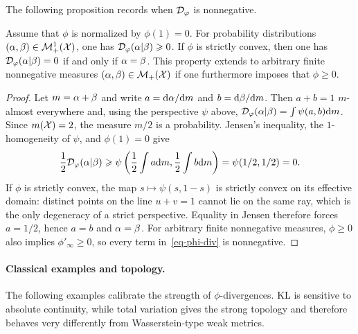 The following proposition records when $\mathcal{D}_\varphi$ is nonnegative.

\begin{proposition}\label{phi-div-positive}
Assume that $\phi$ is normalized by $\phi(1)=0$. For probability distributions $(\alpha,\beta) \in \mathcal{M}_+^1(\mathcal{X})$, one has $\mathcal{D}_\varphi(\alpha|\beta) \geqslant 0$. If $\phi$ is strictly convex, then one has $\mathcal{D}_\varphi(\alpha|\beta)=0$ if and only if $\alpha=\beta$.
%
This property extends to arbitrary finite nonnegative measures $(\alpha,\beta) \in \mathcal{M}_+(\mathcal{X})$ if one furthermore imposes that $\phi \geq 0$.
\end{proposition}

\begin{proof}
	Let $m=\alpha+\beta$ and write $a=\mathrm{d}\alpha/\mathrm{d} m$ and $b=\mathrm{d}\beta/\mathrm{d} m$. Then $a+b=1$ $m$-almost everywhere and, using the perspective $\psi$ above,
		\(\mathcal{D}_\varphi(\alpha|\beta)=\int \psi(a,b)\mathrm{d} m\).
	Since $m(\mathcal{X})=2$, the measure $m/2$ is a probability. Jensen's inequality, the $1$-homogeneity of $\psi$, and $\phi(1)=0$ give
		\[
			\frac12\mathcal{D}_\varphi(\alpha|\beta)
			\geqslant
			\psi\left( \frac12\int a\mathrm{d} m,\frac12\int b\mathrm{d} m \right)
			=\psi(1/2,1/2)=0.
		\]
	If $\phi$ is strictly convex, the map $s\mapsto\psi(s,1-s)$ is strictly convex on its effective domain: distinct points on the line $u+v=1$ cannot lie on the same ray, which is the only degeneracy of a strict perspective. Equality in Jensen therefore forces $a=1/2$, hence $a=b$ and $\alpha=\beta$. For arbitrary finite nonnegative measures, $\phi\geq0$ also implies $\phi'_\infty\geq0$, so every term in~\eqref{eq-phi-div} is nonnegative.
\end{proof}

\paragraph{Classical examples and topology.}

The following examples calibrate the strength of $\phi$-divergences. KL is sensitive to absolute continuity, while total variation gives the strong topology and therefore behaves very differently from Wasserstein-type weak metrics.

